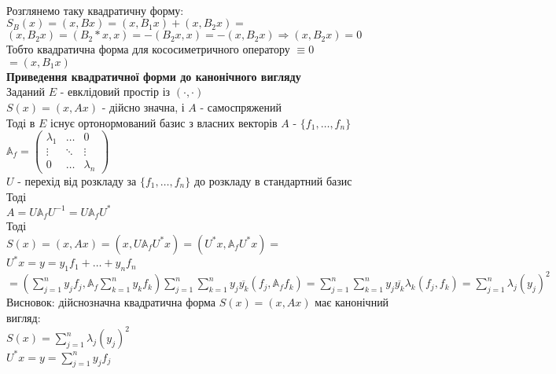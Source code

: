 \documentclass[a4paper, 10pt]{article}
\theoremstyle{theoremdd}
\begin{document}
\bigskip \\
Розглянемо таку квадратичну форму:\\
$S_B(x) = (x,Bx) = (x,B_1x) + (x,B_2x) \boxed{=} $\\
$(x,B_2x) = (B_2*x,x) = -(B_2x,x) = -(x,B_2x) \Rightarrow (x,B_2x) = 0$\\
Тобто квадратична форма для кососиметричного оператору $\equiv 0$\\
$\boxed{=} (x,B_1x)$
\bigskip \\
\textbf{Приведення квадратичної форми до канонічного вигляду}\\
Заданий $E$ - евклідовий простір із $(\cdot,\cdot)$\\
$S(x) = (x,Ax)$ - дійсно значна, і $A$ - самоспряжений\\
Тоді в $E$ існує ортонормований базис з власних векторів $A$ - $\{f_1,\dots,f_n\}$\\
$\mathbb{A}_f = \begin{pmatrix}
\lambda_1 & \dots & 0 \\
\vdots & \ddots & \vdots \\
0 & \dots & \lambda_n
\end{pmatrix}$\\
$U$ - перехід від розкладу за $\{f_1,\dots,f_n\}$ до розкладу в стандартний базис\\
Тоді\\
$A = U \mathbb{A}_{f} U^{-1} = U \mathbb{A}_{f} U^{*}$\\
Тоді\\
$S(x) = (x,Ax) = (x,U \mathbb{A}_{f} U^{*} x) = (U^*x, \mathbb{A}_{f} U^{*} x) =$\\
$U^* x = y = y_1f_1 + \dots + y_nf_n$\\
$= \displaystyle \left(\sum_{j=1}^n y_jf_j, \mathbb{A}_{f} \sum_{k=1}^n y_k f_k \right) \sum_{j=1}^n \sum_{k=1}^n y_j \overline{y_k} (f_j, \mathbb{A}_f f_k) = \sum_{j=1}^n \sum_{k=1}^n y_j \overline{y_k} \lambda_k (f_j,f_k) = \sum_{j=1}^n \lambda_j (y_j)^2$\\
Висновок: дійснозначна квадратична форма $S(x) = (x,Ax)$ має канонічний вигляд:\\
$S(x) = \displaystyle \sum_{j=1}^n \lambda_j (y_j)^2$\\
$U^*x = y = \displaystyle \sum_{j=1}^n y_j f_j$\\
\end{document}
